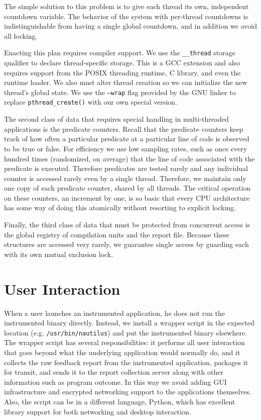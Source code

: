 \documentclass[10pt,twocolumn]{article}
\begin{document}
The simple solution to this problem is to give each thread its own,
independent countdown variable.  The behavior of the system with per-thread
countdowns is indistinguishable from having a single global countdown,
and in addition we avoid all locking.

Enacting this plan requires compiler support.  We use the
\texttt{\_\_thread} storage qualifier to declare thread-specific
storage.  This is a GCC extension and also requires support from the
POSIX threading runtime, C library, and even the runtime loader.  
We also must alter thread creation so we can initialize the
new thread's global state.  We use the \texttt{--wrap} flag provided
by the GNU linker to replace \texttt{pthread\_create()} with our own
special version.  

The second class of data that requires special handling in
multi-threaded applications is the predicate counters.  Recall that
the predicate counters keep track of how often a particular predicate
at a particular line of code is observed to be true or false.
For efficiency we use low sampling rates, such as
once every hundred times (randomized, on average) that the line of
code associated with the predicate is executed.
Therefore predicates are tested rarely and any individual counter
is accessed rarely even by a single thread.  Therefore, we
maintain only one copy of each predicate counter, shared by all
threads.  The critical operation on these counters, an increment by
one, is so basic that every CPU architecture has some way of doing
this atomically without resorting to explicit locking.

Finally, the third class of data that must be protected from concurrent access
is the global registry of compilation units and the report file.
Because these structures are accessed very rarely, we guarantee single 
access by guarding each with its own mutual exclusion lock.


\section{User Interaction}

When a user launches an instrumented application, he does not run the
instrumented binary directly.  Instead, we install a wrapper script in
the expected location (e.g. \texttt{/usr/bin/nautilus}) and put the
instrumented binary elsewhere.  The wrapper script has several
responsibilities:  it performs all user interaction
that goes beyond what the underlying application would normally do, and
it collects the raw feedback report from the instrumented
application, packages it for transit, and sends it to the report
collection server along with other information such as program
outcome.  In this way we avoid adding GUI infrastructure and
encrypted networking support to the applications themselves.
Also, the script can be in a different language, Python,
which has excellent library support for both networking and desktop
interaction.
\end{document}
